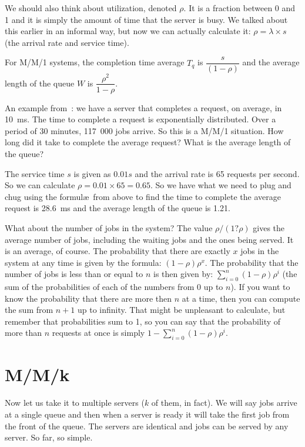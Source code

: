 \documentclass[a4paper]{report}
\begin{document}
We should also think about utilization, denoted $\rho$. It is a fraction between 0 and 1 and it is simply the amount of time that the server is busy. We talked about this earlier in an informal way, but now we can actually calculate it: $\rho = \lambda \times s$ (the arrival rate and service time). 

For M/M/1 systems, the completion time average $T_{q}$ is $\dfrac{s}{(1-\rho)}$ and the average length of the queue $W$ is $\dfrac{\rho^{2}}{1-\rho}$.

An example from~\cite{williams-q}: we have a server that completes a request, on average, in 10~ms. The time to complete a request is exponentially distributed. Over a period of 30 minutes, 117~000 jobs arrive. So this is a M/M/1 situation. How long did it take to complete the average request? What is the average length of the queue?

The service time $s$ is given as $0.01s$ and the arrival rate is 65 requests per second. So we can calculate $\rho = 0.01 \times 65 = 0.65$. So we have what we need to plug and chug using the formul\ae\ from above to find the time to complete the average request is 28.6~ms and the average length of the queue is 1.21.

What about the number of jobs in the system? The value $\rho/(1 ? \rho)$ gives the average number of jobs, including the waiting jobs and the ones being served. It is an average, of course. The probability that there are exactly $x$ jobs in the system at any time is given by the formula: $(1-\rho)\rho^{x}$. The probability that the number of jobs is less than or equal to $n$ is then given by: $\sum\limits_{i=0}^{n}(1-\rho)\rho^{i}$ (the sum of the probabilities of each of the numbers from 0 up to $n$). If you want to know the probability that there are more then $n$ at a time, then you can compute the sum from $n+1$ up to infinity. That might be unpleasant to calculate, but remember that probabilities sum to 1, so you can say that the probability of more than $n$ requests at once is simply $1 - \sum\limits_{i=0}^{n}(1-\rho)\rho^{i}$.

\section*{M/M/k}

Now let us take it to multiple servers ($k$ of them, in fact). We will say jobs arrive at a single queue and then when a server is ready it will take the first job from the front of the queue. The servers are identical and jobs can be served by any server. So far, so simple.
\end{document}
